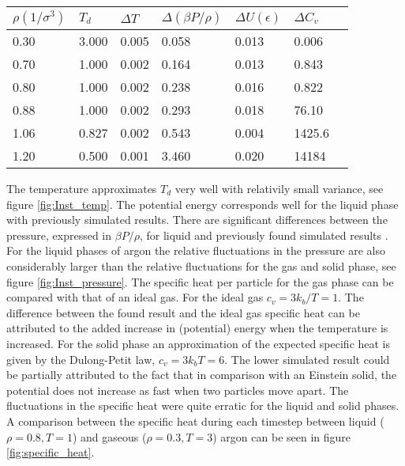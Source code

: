 \begin{center}
\centerfloat
{}
\begin{tabular}{lllllll}
\hline \hline
$\rho(1/\sigma^3)$ & $T_d$ & $\Delta T$ & $\Delta (\beta P/\rho)$ & $\Delta U(\epsilon)$ & $\Delta C_v$ \\
\hline
0.30 & 3.000 & 0.005 & 0.058 & 0.013 & 0.006\\
0.70 & 1.000 & 0.002 & 0.164 & 0.013 & 0.843\\
0.80 & 1.000 & 0.002 & 0.238 & 0.016 & 0.822\\
0.88& 1.000 & 0.002 & 0.293 & 0.018 & 76.10\\
1.06& 0.827& 0.002 & 0.543 & 0.004 & 1425.6\\
1.20 & 0.500 & 0.001 & 3.460 & 0.020 & 14184\\
\hline \hline
\end{tabular}
\vspace{-0.1cm}
\label{table:variance}
\end{center}
The temperature approximates $T_d$ very well with relativily small variance, see figure \ref{fig:Inst_temp}. The potential energy corresponds well for the liquid phase with previously simulated results. There are significant differences between the pressure, expressed in $\beta P/\rho$, for liquid and previously found simulated results \cite{jos}. For the liquid phases of argon the relative fluctuations in the pressure are also considerably larger than the relative fluctuations for the gas and solid phase, see figure \ref{fig:Inst_pressure}. The specific heat per particle for the gas phase can be compared with that of an ideal gas.  For the ideal gas $c_v = 3k_b/T = 1$. The difference between the found result and the ideal gas specific heat can be attributed to the added increase in (potential) energy when the temperature is increased. For the solid phase an approximation of the expected specific heat is given by the Dulong-Petit law, $c_v = 3k_bT =  6$. The lower simulated result could be partially attributed to the fact that in comparison with an Einstein solid, the potential does not increase as fast when two particles move apart. The fluctuations in the specific heat were quite erratic for the liquid and solid phases. A comparison between the specific heat during each timestep between liquid ($\rho = 0.8, T = 1$) and gaseous ($\rho = 0.3, T = 3$) argon can be seen in figure \ref{fig:specific_heat}.

